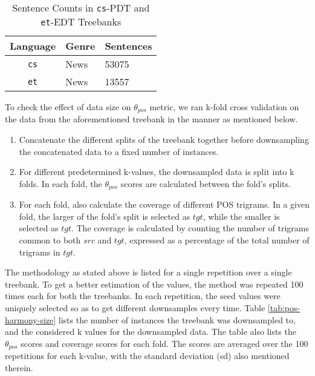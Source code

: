 \begin{table}[H]
    \centering
    \begin{tabular}{|c|l|l|}
        \hline
        \textbf{Language} & \textbf{Genre} & \textbf{Sentences}\\
        \hline
        \texttt{cs} & News & 53075 \\
        \hline
        \texttt{et} & News & 13557 \\
        \hline
    \end{tabular}
    \caption{Sentence Counts in \texttt{cs}-PDT and \texttt{et}-EDT Treebanks}
    \label{tab:pos-harmony-size-datasize}
\end{table}


To check the effect of data size on \(\theta_{pos}\) metric, we ran k-fold cross validation on the data from the aforementioned treebank in the manner as mentioned below.

\begin{enumerate}
    \item Concatenate the different splits of the treebank together before downsampling the concatenated data to a fixed number of instances.
    \item For different predetermined k-values, the downsampled data is split into k folds. In each fold, the \(\theta_{pos}\) scores are calculated between the fold's splits.
    \item For each fold, also calculate the coverage of different POS trigrams. In a given fold, the larger of the fold's split is selected as \(tgt\), while the smaller is selected as \(tgt\). The coverage is calculated by counting the number of trigrams common to both \(src\) and \(tgt\), expressed as a percentage of the total number of trigrams in \(tgt\).
\end{enumerate}

The methodology as stated above is listed for a single repetition over a single treebank. To get a better estimation of the values, the method was repeated 100 times each for both the treebanks. In each repetition, the seed values were uniquely selected so as to get different downsamples every time. Table \ref{tab:pos-harmony-size} lists the number of instances the treebank was downsampled to, and the considered k values for the downsampled data. The table also lists the \(\theta_{pos}\) scores and coverage scores for each fold. The scores are averaged over the 100 repetitions for each k-value, with the standard deviation (sd) also mentioned therein.

